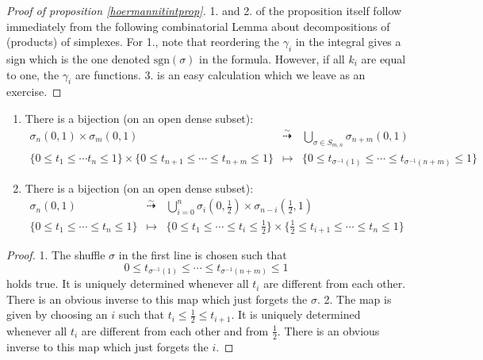 \begin{proof}[Proof of proposition \ref{hoermannitintprop}]
1. and 2. of the proposition itself follow immediately from the following combinatorial Lemma about decompositions of (products) of simplexes. For 1., note that reordering the $\gamma_i$ in the integral gives a sign which is the one denoted $\mathrm{sgn}(\sigma)$ in the formula. However, if all $k_i$ are equal to one, the $\gamma_i$ are functions. 3. is an easy calculation which we leave as an exercise.
\end{proof}

\begin{lemma}\label{hoermannlemmadecomp}
\begin{enumerate}
\item There is a bijection (on an open dense subset):
\begin{eqnarray*}
\sigma_n(0, 1) \times \sigma_m(0, 1) & \overset{\sim}{\dashrightarrow} & \bigcup_{\sigma \in S_{m,n}} \sigma_{n+m}(0,1) \\
\{ 0 \leq t_1 \leq \cdots t_n \leq 1 \} \times \{ 0 \leq t_{n+1} \leq \cdots \leq t_{n+m} \leq 1 \} & \mapsto & \{ 0 \leq t_{\sigma^{-1}(1)} \leq \cdots \leq t_{\sigma^{-1}(n+m)} \leq 1 \}
\end{eqnarray*}
\item There is a bijection (on an open dense subset):
\begin{eqnarray*}
\sigma_n(0, 1) & \overset{\sim}{\dashrightarrow}  & \bigcup_{i=0}^n \sigma_i(0, \frac{1}{2}) \times \sigma_{n-i}(\frac{1}{2}, 1) \\
\{ 0 \leq t_1 \leq \cdots \leq t_n \leq 1 \} & \mapsto & \{ 0 \leq t_1 \leq \cdots \leq t_i \leq \frac{1}{2} \} \times \{\frac{1}{2} \leq t_{i+1} \leq \cdots \leq t_n \leq 1 \}
\end{eqnarray*}
\end{enumerate}
\end{lemma}
\begin{proof} 1. The shuffle $\sigma$ in the first line is chosen such that
\[ 0 \leq t_{\sigma^{-1}(1)} \leq \cdots \leq t_{\sigma^{-1}(n+m)} \leq 1 \]
holds true. It is uniquely determined whenever all $t_i$ are different from each other.
There is an obvious inverse to this map which just forgets the $\sigma$.
2. The map is given by choosing an $i$ such that $t_i \le \frac{1}{2} \le t_{i+1}$.
It is uniquely determined whenever all $t_i$ are different from each other and from $\frac{1}{2}$.
There is an obvious inverse to this map which just forgets the $i$.
\end{proof}


